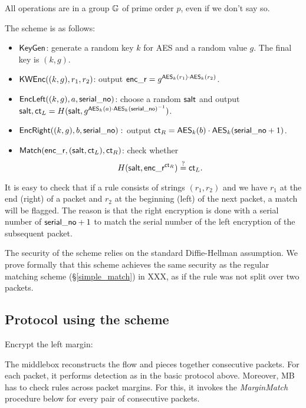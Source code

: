  All operations are in a group $\mathbb{G}$ of prime order $p$, even if we don't say so.  
 
 The scheme is as follows:
 \begin{itemize}
 \item $\mathsf{KeyGen}$: generate a random key $k$ for AES and a random value $g$. The final key is $(k, g)$. 
 \item $\mathsf{KWEnc}((k,g),  r_1, r_2)$: output $\mathsf{enc\_r} = g^{\mathsf{AES}_k(r_1) \cdot \mathsf{AES}_k(r_2)}$. 
 \item $\mathsf{EncLeft}((k, g), a, \mathsf{serial\_no})$: choose a random $\mathsf{salt}$ and output $\mathsf{salt}, \mathsf{ct}_L = H(\mathsf{salt}, g^{\mathsf{AES}_k(a) \cdot \mathsf{AES}_k(\mathsf{serial\_no})^{-1}})$.
 \item $\mathsf{EncRight}((k, g), b, \mathsf{serial\_no}):$ output $\mathsf{ct}_R = \mathsf{AES}_k(b) \cdot \mathsf{AES}_k(\mathsf{serial\_no}+1)$. 
 \item $\mathsf{Match}(\mathsf{enc\_r}, (\mathsf{salt}, \mathsf{ct}_L), \mathsf{ct}_R)$: check whether \[H(\mathsf{salt}, \mathsf{enc\_r}^{\mathsf{ct}_R}) \stackrel{?}{=} \mathsf{ct}_L.\]
 \end{itemize}
 
 It is easy to check that if a rule consists of strings $(r_1, r_2)$ and we have $r_1$ at the end (right) of a packet and $r_2$ at the beginning (left) of the next packet, a match will be flagged. 
 The reason is that the right encryption is done with a serial number of $\mathsf{serial\_no} +1$ to match the serial number of the left encryption of the subsequent packet. 
 
The security of the scheme relies on the standard Diffie-Hellman assumption. We prove formally that this scheme achieves the same security as the regular matching scheme (\S\ref{simple_match}) in XXX, as if the rule was not split over two packets. 
 
\subsection{Protocol using the scheme} \label{sec:cross_prot}
 
 \begin{framed}
\begin{algorithmic}[1]

	\State \Comment Encrypt the left margin: 
		\State {}
	\EndFor
\EndProcedure
\end{algorithmic}
\end{framed}

 
 The middlebox reconstructs the flow and pieces together consecutive packets. For each packet, it performs detection 
as in the basic protocol above. Moreover, MB has to check rules across packet margins. For this, it invokes  the 
{\em MarginMatch} procedure below for every pair of consecutive packets. 


